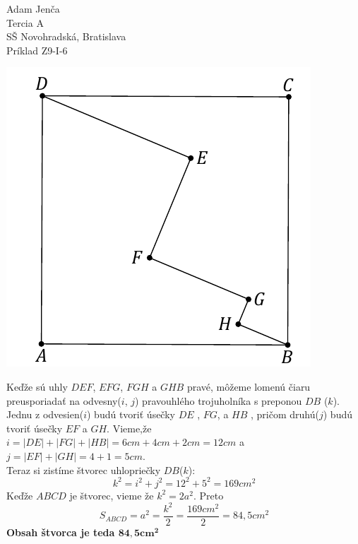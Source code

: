 \documentclass{article}
\begin{document}
\noindent
\large
Adam Jenča\\
Tercia A\\
SŠ Novohradská, Bratislava\\
Príklad Z9-I-6\\
\vskip 5mm \noindent
\begin{center}
	\includegraphics[scale=0.3]{xetex/imagery/squeer}
\end{center}
\vskip 5mm
Keďže sú uhly $DEF$, $EFG$, $FGH$ a $GHB$ pravé, môžeme lomenú čiaru preusporiadať na odvesny($i$, $j$) pravouhlého trojuholníka s preponou $DB$ ($k$). Jednu z odvesien($i$) budú tvoriť úsečky $DE$ , $FG$, a $HB$ , pričom druhú($j$) budú tvoriť úsečky $EF$ a $GH$. Vieme,že $i = |DE| + |FG| + |HB| = 6cm + 4cm + 2cm = 12cm$ a $j = |EF| + |GH| = 4+1=5cm$.\\
Teraz si zistíme štvorec uhlopriečky $DB$($k$):
$$
k^2 = i^2 + j^2 = 12^2 + 5^2 = 169cm^2
$$
Keďže $ABCD$ je štvorec, vieme že $k^2 = 2a^2$. Preto
$$
S_{ABCD} = a^2 = \frac{k^2}{2} = \frac{169cm^2}{2} = 84,5cm^2
$$
\textbf{Obsah štvorca je teda $\mathbf{84,5cm^2}$}
\end{document}
